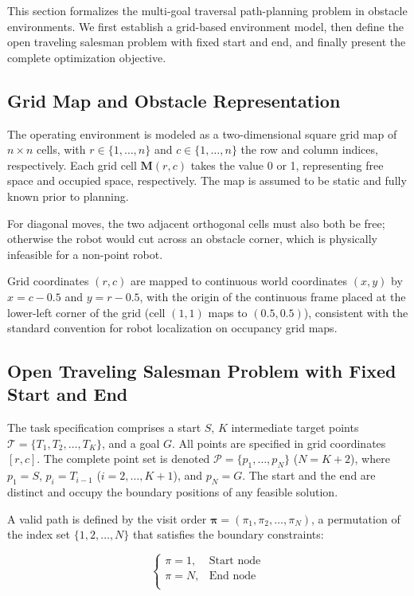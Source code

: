 \documentclass[lettersize,journal]{IEEEtran}
\begin{document}
This section formalizes the multi-goal traversal path-planning problem in obstacle environments. We first establish a grid-based environment model, then define the open traveling salesman problem with fixed start and end, and finally present the complete optimization objective.

\subsection{Grid Map and Obstacle Representation}

The operating environment is modeled as a two-dimensional square grid map of $n \times n$ cells, with $r \in \{1, \dots, n\}$ and $c \in \{1, \dots, n\}$ the row and column indices, respectively. Each grid cell $\mathbf{M}(r, c)$ takes the value 0 or 1, representing free space and occupied space, respectively. The map is assumed to be static and fully known prior to planning.

For diagonal moves, the two adjacent orthogonal cells must also both be free; otherwise the robot would cut across an obstacle corner, which is physically infeasible for a non-point robot.

Grid coordinates $(r, c)$ are mapped to continuous world coordinates $(x, y)$ by $x = c - 0.5$ and $y = r - 0.5$, with the origin of the continuous frame placed at the lower-left corner of the grid (cell $(1,1)$ maps to $(0.5, 0.5)$), consistent with the standard convention for robot localization on occupancy grid maps.

\subsection{Open Traveling Salesman Problem with Fixed Start and End}
\label{subsec:otspp}

The task specification comprises a start $S$, $K$ intermediate target points $\mathcal{T} = \{T_1, T_2, \dots, T_K\}$, and a goal $G$. All points are specified in grid coordinates $[r, c]$. The complete point set is denoted $\mathcal{P} = \{p_1, \dots, p_N\}$ ($N = K + 2$), where $p_1 = S$, $p_i = T_{i-1}$ ($i = 2, \dots, K+1$), and $p_N = G$. The start and the end are distinct and occupy the boundary positions of any feasible solution.

A valid path is defined by the visit order $\bm{\pi} = (\pi_1, \pi_2, \dots, \pi_N)$, a permutation of the index set $\{1, 2, \dots, N\}$ that satisfies the boundary constraints:

\begin{equation}
\begin{cases}
\pi = 1, & \text{Start node} \\
\pi = N, & \text{End node} \\
\end{cases}
\label{eq:boundary}
\end{equation}
\end{document}
